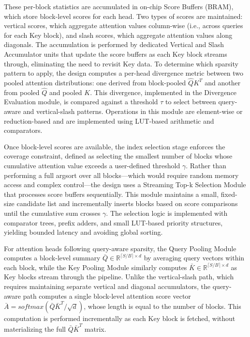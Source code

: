 \documentclass[conference]{IEEEtran}
\begin{document}
These per-block statistics are accumulated in on-chip Score Buffers (BRAM), which store block-level scores for each head. Two types of scores are maintained: vertical scores, which aggregate attention values column-wise (i.e., across queries for each Key block), and slash scores, which aggregate attention values along diagonals. The accumulation is performed by dedicated Vertical and Slash Accumulator units that update the score buffers as each Key block streams through, eliminating the need to revisit Key data. To determine which sparsity pattern to apply, the design computes a per-head divergence metric between two pooled attention distributions: one derived from block-pooled $\hat{Q}K^T$ and another from pooled $\hat{Q}$ and pooled $K$. This divergence, implemented in the Divergence Evaluation module, is compared against a threshold $\tau$ to select between query-aware and vertical-slash patterns. Operations in this module are element-wise or reduction-based and are implemented using LUT-based arithmetic and comparators.

Once block-level scores are available, the index selection stage enforces the coverage constraint, defined as selecting the smallest number of blocks whose cumulative attention value exceeds a user-defined threshold $\gamma$. Rather than performing a full argsort over all blocks—which would require random memory access and complex control—the design uses a Streaming Top-k Selection Module that processes score buffers sequentially. This module maintains a small, fixed-size candidate list and incrementally inserts blocks based on score comparisons until the cumulative sum crosses $\gamma$. The selection logic is implemented with comparator trees, prefix adders, and small LUT-based priority structures, yielding bounded latency and avoiding global sorting. 

For attention heads following query-aware sparsity, the Query Pooling Module computes a block-level summary $\bar{Q} \in \mathbb{R}^{\lceil S/B \rceil \times d}$ by averaging query vectors within each block, while the Key Pooling Module similarly computes $\bar{K} \in \mathbb{R}^{\lceil S/B \rceil \times d}$ as Key blocks stream through the pipeline. Unlike the vertical-slash path, which requires maintaining separate vertical and diagonal accumulators, the query-aware path computes a single block-level attention score vector $\bar{A} = softmax(\bar{Q}\bar{K}^T/\sqrt{d})$, whose length is equal to the number of blocks. This computation is performed incrementally as each Key block is fetched, without materializing the full $\bar{Q}\bar{K}^T$ matrix.
\end{document}
